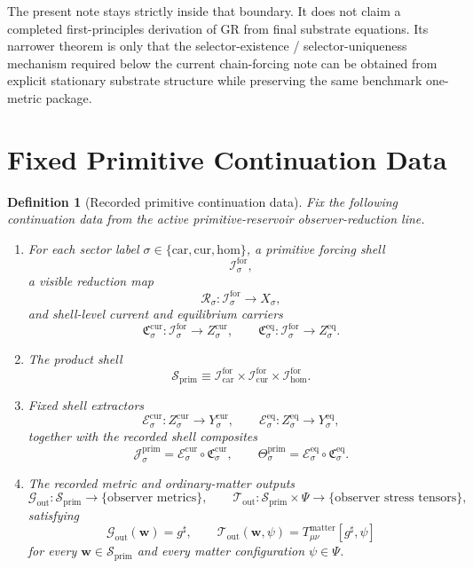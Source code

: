 \documentclass[11pt]{article}
\newcommand{\CompletedMetric}{g^{\sharp}}
\newcommand{\Car}{\mathrm{car}}
\newcommand{\Cur}{\mathrm{cur}}
\newcommand{\Hom}{\mathrm{hom}}
\newcommand{\ForSpace}[1]{\mathcal I_{#1}^{\mathrm{for}}}
\newcommand{\PrimShell}{\mathcal S_{\mathrm{prim}}}
\newcommand{\Reduction}[1]{\mathcal R_{#1}}
\newcommand{\CurrentCarrier}[1]{\mathfrak C_{#1}^{\mathrm{cur}}}
\newcommand{\EqCarrier}[1]{\mathfrak C_{#1}^{\mathrm{eq}}}
\newcommand{\CurrentExtract}[1]{\mathscr E_{#1}^{\mathrm{cur}}}
\newcommand{\EqExtract}[1]{\mathscr E_{#1}^{\mathrm{eq}}}
\newcommand{\PrimCurrent}[1]{\mathcal J_{#1}^{\mathrm{prim}}}
\newcommand{\PrimTheta}[1]{\Theta_{#1}^{\mathrm{prim}}}
\newcommand{\MetricOut}{\mathscr G_{\mathrm{out}}}
\newcommand{\MatterOut}{\mathscr T_{\mathrm{out}}}
\newtheorem{definition}{Definition}
\begin{document}
The present note stays strictly inside that boundary. It does not claim a completed first-principles derivation of GR from final substrate equations. Its narrower theorem is only that the selector-existence / selector-uniqueness mechanism required below the current chain-forcing note can be obtained from explicit stationary substrate structure while preserving the same benchmark one-metric package.

\section{Fixed Primitive Continuation Data}

\begin{definition}[Recorded primitive continuation data]
\label{def:fixed}
Fix the following continuation data from the active primitive-reservoir observer-reduction line.
\begin{enumerate}
    \item For each sector label \(\sigma\in\{\Car,\Cur,\Hom\}\), a primitive forcing shell
    \[
    \ForSpace{\sigma},
    \]
    a visible reduction map
    \[
    \Reduction{\sigma}:\ForSpace{\sigma}\to X_{\sigma},
    \]
    and shell-level current and equilibrium carriers
    \[
    \CurrentCarrier{\sigma}:\ForSpace{\sigma}\to Z_{\sigma}^{\mathrm{cur}},
    \qquad
    \EqCarrier{\sigma}:\ForSpace{\sigma}\to Z_{\sigma}^{\mathrm{eq}}.
    \]
    \item The product shell
    \[
    \PrimShell
    \equiv
    \ForSpace{\Car}\times \ForSpace{\Cur}\times \ForSpace{\Hom}.
    \]
    \item Fixed shell extractors
    \[
    \CurrentExtract{\sigma}:Z_{\sigma}^{\mathrm{cur}}\to Y_{\sigma}^{\mathrm{cur}},
    \qquad
    \EqExtract{\sigma}:Z_{\sigma}^{\mathrm{eq}}\to Y_{\sigma}^{\mathrm{eq}},
    \]
    together with the recorded shell composites
    \begin{equation}
    \PrimCurrent{\sigma}
    =
    \CurrentExtract{\sigma}\circ \CurrentCarrier{\sigma},
    \qquad
    \PrimTheta{\sigma}
    =
    \EqExtract{\sigma}\circ \EqCarrier{\sigma}.
    \label{eq:primcomposites}
    \end{equation}
    \item The recorded metric and ordinary-matter outputs
    \[
    \MetricOut:\PrimShell\to\{\text{observer metrics}\},
    \qquad
    \MatterOut:\PrimShell\times\Psi\to\{\text{observer stress tensors}\},
    \]
    satisfying
    \begin{equation}
    \MetricOut(\mathbf w)=\CompletedMetric,
    \qquad
    \MatterOut(\mathbf w,\psi)
    =
    T_{\mu\nu}^{\mathrm{matter}}[\CompletedMetric,\psi]
    \label{eq:fixedoutputs}
    \end{equation}
    for every \(\mathbf w\in\PrimShell\) and every matter configuration \(\psi\in\Psi\).
\end{enumerate}
\end{definition}
\end{document}
